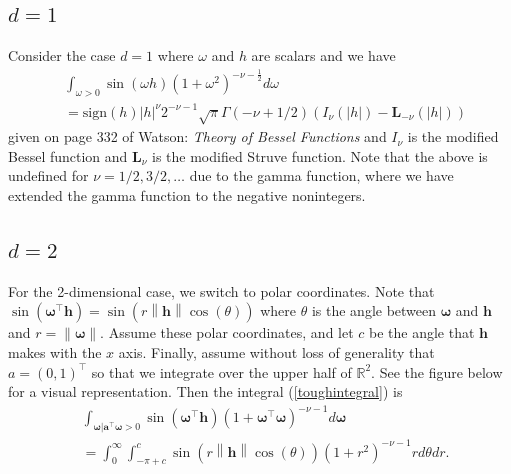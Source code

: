 \documentclass[11pt]{article}
\newcommand{\vint}{\boldsymbol{\omega}}
\newcommand{\vpla}{\boldsymbol{a}}
\begin{document}
\subsection{$d=1$}
 Consider the case $d=1$ where $\omega$ and $h$ are scalars and we have 
  \begin{align*}
&\int_{\omega > 0}\sin(\omega h)(1 + \omega^2)^{-\nu- \frac{1}{2}} d\omega \\
&= \textrm{sign}(h) |h|^{\nu} 2^{-\nu-1} \sqrt{\pi} \Gamma(-\nu + 1/2)\left(I_{\nu}(|h|) - \boldsymbol{L}_{-\nu} (|h|)\right)
 \end{align*}given on page 332 of Watson: \textit{Theory of Bessel Functions} and $I_\nu$ is the modified Bessel function and $\boldsymbol{L}_\nu$ is the modified Struve function. Note that the above is undefined for $\nu = 1/2, 3/2, \dots$ due to the gamma function, where we have extended the gamma function to the negative nonintegers. 
 
 \subsection{$d=2$}
 
 
 For the 2-dimensional case, we switch to polar coordinates. Note that $\sin(\vint^\top \boldsymbol{h}) = \sin(r \left\lVert \boldsymbol{h}\right\rVert \cos(\theta))$ where $\theta$ is the angle between $\vint$ and $\boldsymbol{h}$ and $r = \left\lVert \vint \right\rVert$. Assume these polar coordinates, and let $c$ be the angle that $\boldsymbol{h}$ makes with the $x$ axis. Finally, assume without loss of generality that $a = (0,1)^\top$ so that we integrate over the upper half of $\mathbb{R}^2$. See the figure below for a visual representation. Then the integral (\ref{toughintegral}) is \begin{align*}
&\int_{\vint | \vpla^\top \vint > 0}\sin(\vint^\top \boldsymbol{h})(1 + \vint^\top \vint)^{-\nu- 1} d\vint \\
&= \int_0^\infty  \int_{-\pi + c}^{c} \sin(r\left\lVert \boldsymbol{h}\right\rVert \cos(\theta)) (1 +r^2)^{- \nu - 1} r d\theta dr. %
 \end{align*}
\end{document}
